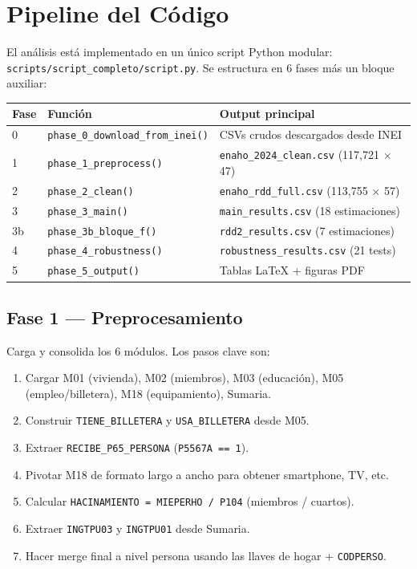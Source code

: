 \documentclass[12pt, a4paper]{article}
\begin{document}
\section{Pipeline del Código}

El análisis está implementado en un único script Python modular:
\texttt{scripts/script\_completo/script.py}. Se estructura en 6 fases más
un bloque auxiliar:

\begin{center}
\begin{tabular}{lll}
\toprule
Fase & Función & Output principal \\\midrule
0 & \texttt{phase\_0\_download\_from\_inei()} & CSVs crudos descargados desde INEI \\
1 & \texttt{phase\_1\_preprocess()} & \texttt{enaho\_2024\_clean.csv} (117{,}721 × 47) \\
2 & \texttt{phase\_2\_clean()} & \texttt{enaho\_rdd\_full.csv} (113{,}755 × 57) \\
3 & \texttt{phase\_3\_main()} & \texttt{main\_results.csv} (18 estimaciones) \\
3b & \texttt{phase\_3b\_bloque\_f()} & \texttt{rdd2\_results.csv} (7 estimaciones) \\
4 & \texttt{phase\_4\_robustness()} & \texttt{robustness\_results.csv} (21 tests) \\
5 & \texttt{phase\_5\_output()} & Tablas LaTeX + figuras PDF \\
\bottomrule
\end{tabular}
\end{center}

\subsection{Fase 1 — Preprocesamiento}

Carga y consolida los 6 módulos. Los pasos clave son:
\begin{enumerate}[noitemsep]
  \item Cargar M01 (vivienda), M02 (miembros), M03 (educación), M05
    (empleo/billetera), M18 (equipamiento), Sumaria.
  \item Construir \texttt{TIENE\_BILLETERA} y \texttt{USA\_BILLETERA} desde M05.
  \item Extraer \texttt{RECIBE\_P65\_PERSONA} (\texttt{P5567A == 1}).
  \item Pivotar M18 de formato largo a ancho para obtener smartphone, TV, etc.
  \item Calcular \texttt{HACINAMIENTO = MIEPERHO / P104} (miembros / cuartos).
  \item Extraer \texttt{INGTPU03} y \texttt{INGTPU01} desde Sumaria.
  \item Hacer merge final a nivel persona usando las llaves de hogar + \texttt{CODPERSO}.
\end{enumerate}
\end{document}
